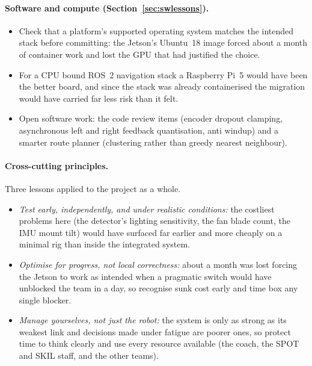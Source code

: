 \documentclass[11pt]{article}
\begin{document}
\paragraph{Software and compute (Section~\ref{sec:swlessons}).}
\begin{itemize}[noitemsep]
    \item Check that a platform's supported operating system matches the intended stack before committing: the Jetson's Ubuntu~18 image forced about a month of container work and lost the GPU that had justified the choice.
    \item For a CPU bound ROS~2 navigation stack a Raspberry Pi~5 would have been the better board, and since the stack was already containerised the migration would have carried far less risk than it felt.
    \item Open software work: the code review items (encoder dropout clamping, asynchronous left and right feedback quantisation, anti windup) and a smarter route planner (clustering rather than greedy nearest neighbour).
\end{itemize}

\paragraph{Cross-cutting principles.} Three lessons applied to the project as a whole.
\begin{itemize}[noitemsep]
    \item \emph{Test early, independently, and under realistic conditions:} the costliest problems here (the detector's lighting sensitivity, the fan blade count, the IMU mount tilt) would have surfaced far earlier and more cheaply on a minimal rig than inside the integrated system.
    \item \emph{Optimise for progress, not local correctness:} about a month was lost forcing the Jetson to work as intended when a pragmatic switch would have unblocked the team in a day, so recognise sunk cost early and time box any single blocker.
    \item \emph{Manage yourselves, not just the robot:} the system is only as strong as its weakest link and decisions made under fatigue are poorer ones, so protect time to think clearly and use every resource available (the coach, the SPOT and SKIL staff, and the other teams).
\end{itemize}

\end{document}
